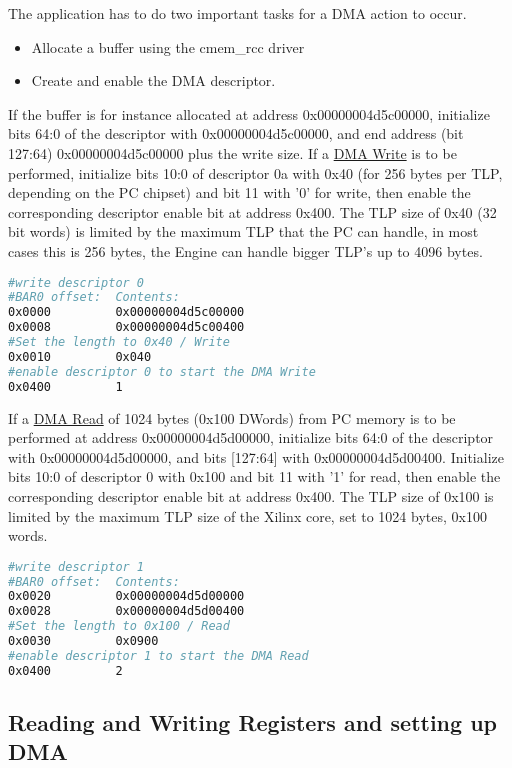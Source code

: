 The application has to do two important tasks for a DMA action to occur.
\begin{itemize}
	\item Allocate a buffer using the cmem\_rcc driver
	\item Create and enable the DMA descriptor.
\end{itemize}

If the buffer is for instance allocated at address 0x00000004d5c00000, initialize bits 64:0 of the descriptor with 0x00000004d5c00000, and end address (bit 127:64) 0x00000004d5c00000 plus the write size. If a \underline{DMA Write} is to be performed, initialize bits 10:0 of descriptor 0a with 0x40 (for 256 bytes per TLP, depending on the PC chipset) and bit 11 with '0' for write, then enable the corresponding descriptor enable bit at address 0x400. The TLP size of 0x40 (32 bit words) is limited by the maximum TLP that the PC can handle, in most cases this is 256 bytes, the Engine can handle bigger TLP's up to 4096 bytes.
\begin{lstlisting}[language=BASH, frame=single, caption=Create a Write descriptor]
#write descriptor 0
#BAR0 offset:  Contents:
0x0000         0x00000004d5c00000
0x0008         0x00000004d5c00400
#Set the length to 0x40 / Write
0x0010         0x040
#enable descriptor 0 to start the DMA Write
0x0400         1
\end{lstlisting}
If a \underline{DMA Read} of 1024 bytes (0x100 DWords) from PC memory is to be performed at address 0x00000004d5d00000, initialize bits 64:0 of the descriptor with 0x00000004d5d00000, and bits [127:64] with 0x00000004d5d00400. Initialize bits 10:0 of descriptor 0 with 0x100 and bit 11 with '1' for read, then enable the corresponding descriptor enable bit at address 0x400. The TLP size of 0x100 is limited by the maximum TLP size of the Xilinx core, set to 1024 bytes, 0x100 words.
\begin{lstlisting}[language=BASH, frame=single, caption=Create a Read descriptor]
#write descriptor 1
#BAR0 offset:  Contents:
0x0020         0x00000004d5d00000
0x0028         0x00000004d5d00400
#Set the length to 0x100 / Read
0x0030         0x0900
#enable descriptor 1 to start the DMA Read
0x0400         2
\end{lstlisting}


\subsection{Reading and Writing Registers and setting up DMA}

